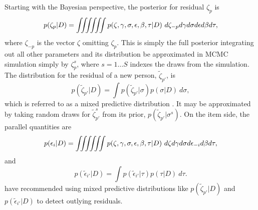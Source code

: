 \documentclass[12pt, letterpaper]{article}
\begin{document}
Starting with the Bayesian perspective, the posterior for residual $\zeta_p$ is
\begin{equation}
	p(\zeta_p | D) =
	\iiiiiint
		p(\zeta, \gamma, \sigma, \epsilon, \beta, \tau | D)
	~d \zeta_{-p} d \gamma d \sigma d \epsilon d \beta d \tau
,\end{equation}
where $\zeta_{-p}$ is the vector $\zeta$ omitting $\zeta_p$. This is simply the full posterior integrating out all other parameters and its distribution be approximated in MCMC simulation simply by $\zeta_p^s$, where $s = 1 \ldots S$ indexes the draws from the simulation. The distribution for the residual of a new person, $\tilde \zeta_{p'}$, is
\begin{equation}
	p(\tilde \zeta_{p'} | D)
	= \int p(\tilde \zeta_{p'} | \sigma) p(\sigma | D) ~d\sigma
,\end{equation}
which is referred to as a mixed predictive distribution \parencite{Gelman1996}. It may be approximated by taking random draws for $\tilde \zeta_{p'}^s$ from its prior, $p(\tilde \zeta_{p'} | \sigma^s)$. On the item side, the parallel quantities are
\begin{equation}
	p(\epsilon_i | D) =
	\iiiiiint
		p(\zeta, \gamma, \sigma, \epsilon, \beta, \tau | D)
	~d \zeta d \gamma d \sigma d \epsilon_{-i} d \beta d \tau
,\end{equation}
and
\begin{equation}
	p(\tilde \epsilon_{i'} | D)
	= \int p(\tilde \epsilon_{i'} | \tau) p(\tau | D) ~d\tau
.\end{equation}
\textcite{marshall2007identifying} have recommended using mixed predictive distributions like $p(\tilde \zeta_{p'} | D)$ and $p(\tilde \epsilon_{i'} | D)$ to detect outlying residuals.
\end{document}
